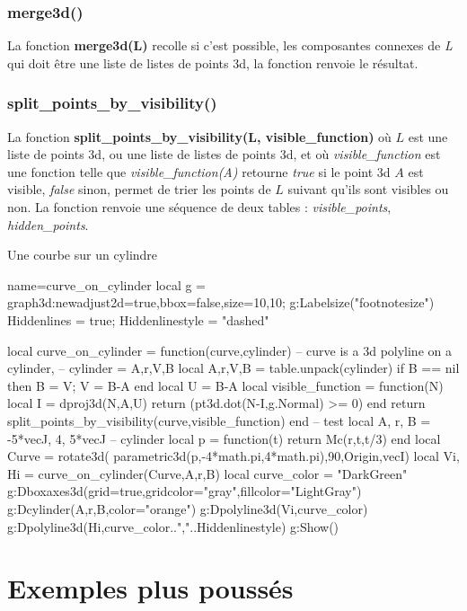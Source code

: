 \subsubsection{merge3d()}
La fonction \textbf{merge3d(L)} recolle si c'est possible, les composantes connexes de \emph{L} qui doit être une liste de listes de points 3d, la fonction renvoie le résultat.

\subsubsection{split\_points\_by\_visibility()}
La fonction \textbf{split\_points\_by\_visibility(L, visible\_function)} où $L$ est une liste de points 3d, ou une liste de listes de points 3d, et où \emph{visible\_function} est une fonction telle que \emph{visible\_function(A)} retourne \emph{true} si le point 3d $A$ est visible, \emph{false} sinon, permet de trier les points de $L$ suivant qu'ils sont visibles ou non. La fonction renvoie une séquence de deux tables : \emph{visible\_points}, \emph{hidden\_points}.

\begin{demo}{Une courbe sur un cylindre}
\begin{luadraw}{name=curve_on_cylinder}
local g = graph3d:new{adjust2d=true,bbox=false,size={10,10}};
g:Labelsize("footnotesize")
Hiddenlines = true; Hiddenlinestyle = "dashed"

local curve_on_cylinder = function(curve,cylinder) 
-- curve is a 3d polyline on a cylinder, 
-- cylinder = {A,r,V,B}
    local  A,r,V,B = table.unpack(cylinder)
    if B == nil then B = V; V = B-A end
    local U = B-A
    local visible_function = function(N)
        local I = dproj3d(N,{A,U})
        return (pt3d.dot(N-I,g.Normal) >= 0)
    end
    return split_points_by_visibility(curve,visible_function)
end
-- test
local A, r, B = -5*vecJ, 4, 5*vecJ -- cylinder
local p = function(t) return Mc(r,t,t/3) end
local Curve = rotate3d( parametric3d(p,-4*math.pi,4*math.pi),90,{Origin,vecI})
local Vi, Hi = curve_on_cylinder(Curve,{A,r,B})
local curve_color = "DarkGreen"
g:Dboxaxes3d({grid=true,gridcolor="gray",fillcolor="LightGray"})
g:Dcylinder(A,r,B,{color="orange"})
g:Dpolyline3d(Vi,curve_color)
g:Dpolyline3d(Hi,curve_color..","..Hiddenlinestyle)
g:Show()
\end{luadraw}
\end{demo}

\section{Exemples plus poussés}


